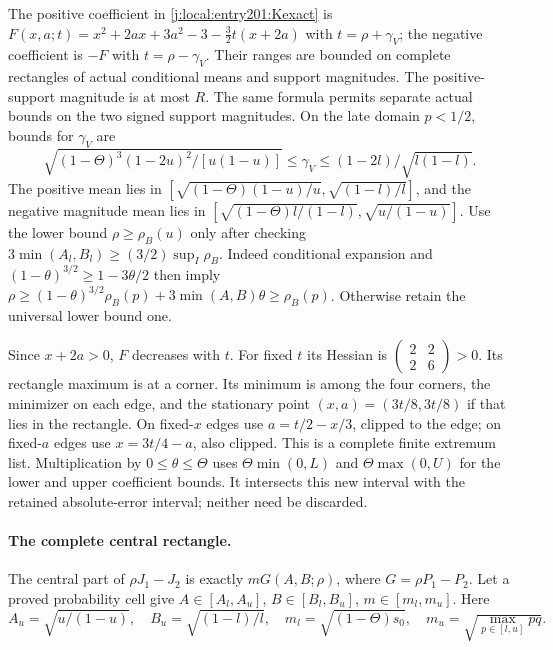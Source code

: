 The positive coefficient in \eqref{j:local:entry201:Kexact} is
$F(x,a;t)=x^2+2ax+3a^2-3-\tfrac32t(x+2a)$
with $t=\rho+\gamma_V$; the negative coefficient is $-F$
with $t=\rho-\gamma_V$. Their ranges are bounded on complete
rectangles of actual conditional means and support magnitudes.
The positive-support magnitude is at most $R$.
The same formula permits separate actual bounds on the two signed support magnitudes.
On the late domain $p<1/2$, bounds for $\gamma_V$ are
\[
 \sqrt{(1-\Theta)^3(1-2u)^2/[u(1-u)]}
 \le\gamma_V\le(1-2l)/\sqrt{l(1-l)}.
\]
The positive mean lies in
$[\sqrt{(1-\Theta)(1-u)/u},\sqrt{(1-l)/l}]$, and the negative
magnitude mean lies in
$[\sqrt{(1-\Theta)l/(1-l)},\sqrt{u/(1-u)}]$.
Use the lower bound $\rho\ge\rho_B(u)$ only after checking
$3\min(A_l,B_l)\ge(3/2)\sup_I\rho_B$. Indeed conditional expansion
and $(1-\theta)^{3/2}\ge1-3\theta/2$ then imply
$\rho\ge(1-\theta)^{3/2}\rho_B(p)+3\min(A,B)\theta\ge\rho_B(p)$.
Otherwise retain the universal lower bound one.

Since $x+2a>0$, $F$ decreases with $t$.
For fixed $t$ its Hessian is
$\left(\begin{smallmatrix}2&2\\2&6\end{smallmatrix}\right)>0$.
Its rectangle maximum is at a corner. Its minimum is among the four
corners, the minimizer on each edge, and the stationary point
$(x,a)=(3t/8,3t/8)$ if that lies in the rectangle.
On fixed-$x$ edges use $a=t/2-x/3$, clipped to the edge; on
fixed-$a$ edges use $x=3t/4-a$, also clipped.
This is a complete finite extremum list.
Multiplication by $0\le\theta\le\Theta$ uses
$\Theta\min(0,L)$ and $\Theta\max(0,U)$ for the lower and upper
coefficient bounds. It intersects this new interval with the retained
absolute-error interval; neither need be discarded.

\paragraph{The complete central rectangle.}
The central part of $\rho J_1-J_2$ is exactly
$mG(A,B;\rho)$, where $G=\rho P_1-P_2$.
Let a proved probability cell give
$A\in[A_l,A_u]$, $B\in[B_l,B_u]$, $m\in[m_l,m_u]$.
Here
\[
 A_u=\sqrt{u/(1-u)},\quad B_u=\sqrt{(1-l)/l},\quad
 m_l=\sqrt{(1-\Theta)s_0},\quad
 m_u=\sqrt{\max_{p\in[l,u]}pq}.
\]

